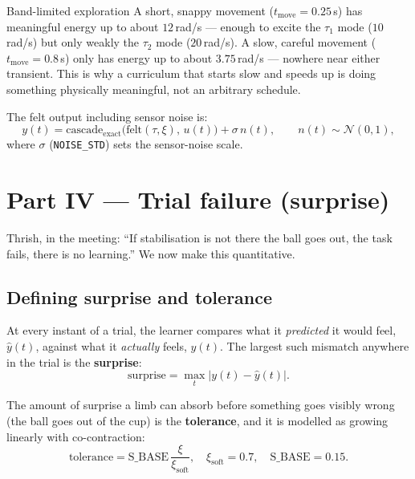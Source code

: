 \documentclass[11pt,a4paper]{article}
\newcommand{\surprise}{\text{surprise}}
\begin{document}
\begin{examplebox}{Band-limited exploration}
A short, snappy movement ($t_{\mathrm{move}}=0.25$\,s) has meaningful energy
up to about $12$\,rad/s --- enough to excite the $\tau_1$ mode ($10$\,rad/s)
but only weakly the $\tau_2$ mode ($20$\,rad/s). A slow, careful movement
($t_{\mathrm{move}}=0.8$\,s) only has energy up to about $3.75$\,rad/s ---
nowhere near either transient. This is why a curriculum that starts slow and
speeds up is doing something physically meaningful, not an arbitrary schedule.
\end{examplebox}

The felt output including sensor noise is:
\begin{equation}
y(t) = \text{cascade}_{\text{exact}}\bigl(\text{felt}(\tau,\xi),\, u(t)\bigr) + \sigma\, n(t),
\qquad n(t)\sim\mathcal N(0,1),
\label{eq:output}
\end{equation}
where $\sigma$ (\texttt{NOISE\_STD}) sets the sensor-noise scale.

\section{Part IV --- Trial failure (surprise)}
\label{sec:failure}

Thrish, in the meeting: ``If stabilisation is not there the ball goes out, the
task fails, there is no learning.'' We now make this quantitative.

\subsection{Defining surprise and tolerance}

At every instant of a trial, the learner compares what it \emph{predicted} it
would feel, $\hat y(t)$, against what it \emph{actually} feels, $y(t)$. The
largest such mismatch anywhere in the trial is the \textbf{surprise}:
\begin{equation}
\surprise = \max_t \bigl|y(t)-\hat y(t)\bigr|.
\label{eq:surprise}
\end{equation}

The amount of surprise a limb can absorb before something goes visibly wrong
(the ball goes out of the cup) is the \textbf{tolerance}, and it is modelled as
growing linearly with co-contraction:
\begin{equation}
\text{tolerance} = \mathrm{S\_BASE}\,\frac{\xi}{\xi_{\mathrm{soft}}},
\quad \xi_{\mathrm{soft}}=0.7,\quad \mathrm{S\_BASE}=0.15.
\label{eq:tolerance}
\end{equation}
\end{document}
